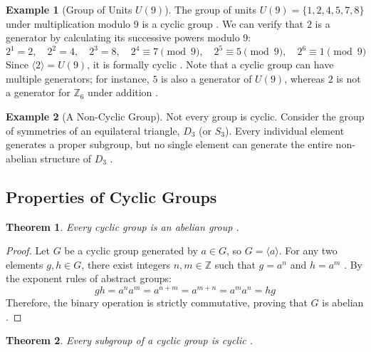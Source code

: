 \documentclass[11pt]{article}
\theoremstyle{definition}
\newtheorem{example}{Example}[section]
\theoremstyle{plain}
\newtheorem{theorem}{Theorem}[section]
\theoremstyle{remark}
\begin{document}
\begin{example}[Group of Units $U(9)$]
The group of units $U(9) = \{1, 2, 4, 5, 7, 8\}$ under multiplication modulo 9 is a cyclic group \cite{gallian}. We can verify that $2$ is a generator by calculating its successive powers modulo 9:
\begin{equation}
    2^1 = 2, \quad 2^2 = 4, \quad 2^3 = 8, \quad 2^4 \equiv 7 \pmod 9, \quad 2^5 \equiv 5 \pmod 9, \quad 2^6 \equiv 1 \pmod 9
\end{equation}
Since $\langle 2 \rangle = U(9)$, it is formally cyclic \cite{gallian}. Note that a cyclic group can have multiple generators; for instance, $5$ is also a generator of $U(9)$, whereas $2$ is not a generator for $\mathbb{Z}_6$ under addition \cite{dummit}.
\end{example}

\begin{example}[A Non-Cyclic Group]
Not every group is cyclic. Consider the group of symmetries of an equilateral triangle, $D_3$ (or $S_3$). Every individual element generates a proper subgroup, but no single element can generate the entire non-abelian structure of $D_3$ \cite{gallian}.
\end{example}

\subsection{Properties of Cyclic Groups}

\begin{theorem}
Every cyclic group is an abelian group \cite{fraleigh}.
\end{theorem}

\begin{proof}
Let $G$ be a cyclic group generated by $a \in G$, so $G = \langle a \rangle$. For any two elements $g, h \in G$, there exist integers $n, m \in \mathbb{Z}$ such that $g = a^n$ and $h = a^m$ \cite{dummit}. By the exponent rules of abstract groups:
\begin{equation}
    gh = a^n a^m = a^{n+m} = a^{m+n} = a^m a^n = hg
\end{equation}
Therefore, the binary operation is strictly commutative, proving that $G$ is abelian \cite{gallian}.
\end{proof}

\begin{theorem}
Every subgroup of a cyclic group is cyclic \cite{dummit}.
\end{theorem}
\end{document}
